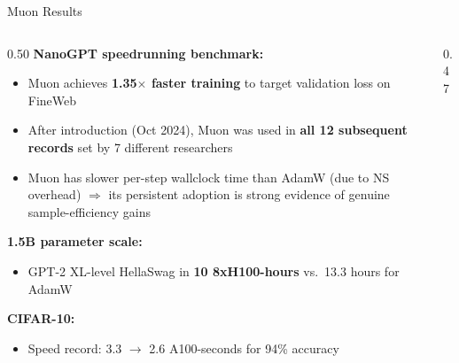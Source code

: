 \begin{frame}{Muon Results}

  \begin{columns}[T]
    \begin{column}{0.50\textwidth}
      \textbf{NanoGPT speedrunning benchmark:}
      \begin{itemize}
        \item Muon achieves \textbf{1.35$\times$ faster training} to target validation loss on FineWeb
        \item After introduction (Oct 2024), Muon was used in \textbf{all 12 subsequent records} set by 7 different researchers
        \item Muon has slower per-step wallclock time than AdamW (due to NS overhead) $\Rightarrow$ its persistent adoption is strong evidence of genuine sample-efficiency gains
      \end{itemize}

      \vspace{0.3em}
      \textbf{1.5B parameter scale:}
      \begin{itemize}
        \item GPT-2 XL-level HellaSwag in \textbf{10 8xH100-hours} vs.\ 13.3 hours for AdamW
      \end{itemize}

      \vspace{0.3em}
      \textbf{CIFAR-10:}
      \begin{itemize}
        \item Speed record: 3.3 $\to$ 2.6 A100-seconds for 94\% accuracy
      \end{itemize}
    \end{column}
    \begin{column}{0.47\textwidth}
      \begin{center}
\end{center}
\end{column}
\end{columns}
\end{frame}
